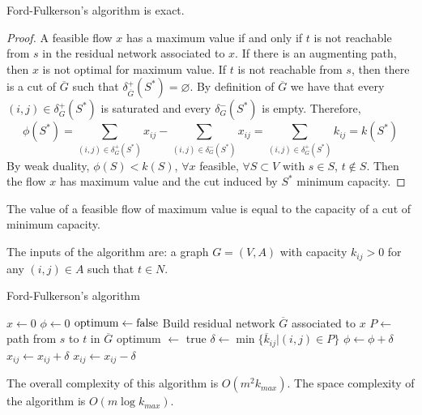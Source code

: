 \documentclass[12pt, a4paper]{report}
\newtheorem[style=M,bodystyle=\normalfont]{proposition}{Proposition}
\newtheorem[style=M,bodystyle=\normalfont]{theorem}{Theorem}
\newtheorem[style=M,bodystyle=\normalfont]{corollary}{Corollary}
\newtheorem[style=M,bodystyle=\normalfont]{lemma}{Lemma}
\newtheorem[style=M,bodystyle=\normalfont]{definition}{Definition}
\begin{document}
    \begin{proposition}
        Ford-Fulkerson's algorithm is exact. 
    \end{proposition}
    \begin{proof}
        A feasible flow $x$ has a maximum value if and only if $t$ is not reachable from $s$ in the residual network associated to $x$. If 
        there is an augmenting path, then $x$ is not optimal for maximum value. If $t$ is not reachable from $s$, then there is a cut of 
        $\overline{G}$ such that $\delta^{+}_{\overline{G}}(S^{*})=\varnothing$. By definition of $\overline{G}$ we have that every 
        $(i,j) \in \delta^{+}_{G}(S^{*})$ is saturated and every $\delta^{-}_{G}(S^{*})$ is empty. Therefore,
        \[\phi(S^{*})=\sum_{(i,j) \in \delta^{+}_{G}(S^{*})}{x_{ij}}-\sum_{(i,j) \in \delta^{-}_{G}(S^{*})}{x_{ij}}=
        \sum_{(i,j) \in \delta^{+}_{G}(S^{*})}{k_{ij}}=k(S^{*})\]
        By weak duality, $\phi(S) < k(S)$, $\forall x$ feasible, $\forall S \subset V$ with $s \in S$, $t \notin S$. Then the flow $x$ has
        maximum value and the cut induced by $S^{*}$ minimum capacity. 
    \end{proof}
    \begin{theorem}
        The value of a feasible flow of maximum value is equal to the capacity of a cut of minimum capacity.
    \end{theorem}
    The inputs of the algorithm are: a graph $G=(V,A)$ with capacity $k_{ij}>0$ for any $(i,j) \in A$ such that $t \in N$. 
    \begin{algorithm}[H]
        \caption{Ford-Fulkerson's algorithm}
            \begin{algorithmic}[1]
                \State $x \leftarrow 0$
                \State $\phi \leftarrow 0$
                \State $\textnormal{optimum} \leftarrow \textnormal{false}$
                    \State Build residual network $\overline{G}$ associated to $x$
                    \State $P \leftarrow$ path from $s$ to $t$ in $\overline{G}$
                        \State optimum $\leftarrow$ true
                    \Else
                        \State $\delta \leftarrow \min\{\overline{k}_{ij}|(i,j) \in P\}$
                        \State $\phi \leftarrow \phi + \delta$
                                \State $x_{ij} \leftarrow x_{ij}+\delta$
                            \Else 
                                \State $x_{ij} \leftarrow x_{ij}-\delta$
                            \EndIf
                        \EndFor
                    \EndIf
                \EndWhile
            \end{algorithmic}
    \end{algorithm}
    The overall complexity of this algorithm is $O(m^2k_{max})$. The space complexity of the algorithm is $O(m\log{k_{max}})$. 
\end{document}
